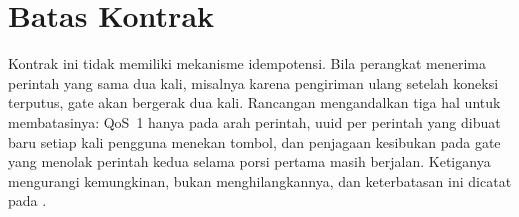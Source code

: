 \section{Batas Kontrak}

Kontrak ini tidak memiliki mekanisme idempotensi. Bila perangkat menerima
perintah yang sama dua kali, misalnya karena pengiriman ulang setelah koneksi
terputus, gate akan bergerak dua kali. Rancangan mengandalkan tiga hal untuk
membatasinya: QoS~1 hanya pada arah perintah, uuid per perintah yang dibuat baru
setiap kali pengguna menekan tombol, dan penjagaan kesibukan pada gate yang
menolak perintah kedua selama porsi pertama masih berjalan. Ketiganya mengurangi
kemungkinan, bukan menghilangkannya, dan keterbatasan ini dicatat pada
.
